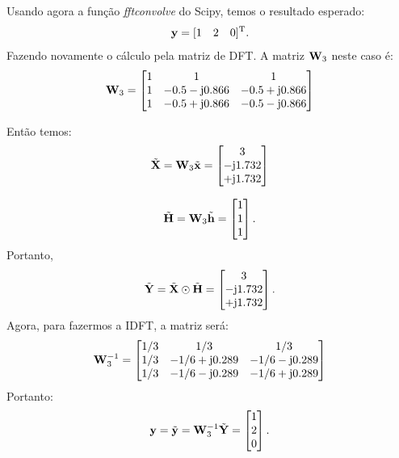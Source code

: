 \documentclass{homeworkclass}
\begin{document}
\begin{homeworkProblem}
\begin{equation*}
	\end{equation*}
	Usando agora a função \textit{fftconvolve} do Scipy, temos o resultado esperado:
	\begin{equation*}
	\mathbf{y} = [1 \quad 2 \quad 0]^{\mathrm{T}}. 
	\end{equation*}
	Fazendo novamente o cálculo pela matriz de DFT. A matriz $\mathbf{W}_{3}$ neste caso é:
	\begin{equation*} \mathbf{W}_{3} = 
	\begin{bmatrix} 
	1  & 1 & 1 \\ 
	1 & -0.5-\mathrm{j}0.866 & -0.5+\mathrm{j}0.866 \\
	1 & -0.5+\mathrm{j}0.866 & -0.5-\mathrm{j}0.866	
	\end{bmatrix}
	\end{equation*}
	
	Então temos:
	\begin{equation*}
	\tilde{\mathbf{X}} = \mathbf{W}_{3}\tilde{\mathbf{x}} = 	\begin{bmatrix} 
	3 \\ 
	-\mathrm{j}1.732 \\
	+\mathrm{j}1.732
	\end{bmatrix}
	\end{equation*}

	\begin{equation*}
	\tilde{\mathbf{H}} = \mathbf{W}_{3}\tilde{\mathbf{h}} = 	\begin{bmatrix} 
	1 \\ 
	1 \\ 
	1 
	\end{bmatrix}.
	\end{equation*}
	Portanto,
	\begin{equation*}
	\tilde{\mathbf{Y}} = \tilde{\mathbf{X}} \odot \tilde{\mathbf{H}} = \begin{bmatrix} 
	3 \\ 
	-\mathrm{j}1.732 \\
	+\mathrm{j}1.732
	\end{bmatrix}.
	\end{equation*}
	Agora, para fazermos a IDFT, a matriz será:
	\begin{equation*}  \mathbf{W}_{3}^{-1} = 
	\begin{bmatrix} 
	1/3  & 1/3 & 1/3 \\ 
	1/3 & -1/6 +\mathrm{j}0.289 & -1/6-\mathrm{j}0.289 \\
	1/3 & -1/6 -\mathrm{j}0.289 & -1/6+\mathrm{j}0.289	
	\end{bmatrix}
	\end{equation*}
	Portanto:
	\begin{equation*}
	\mathbf{y} = \tilde{\mathbf{y}} = \mathbf{W}_{3}^{-1} \tilde{\mathbf{Y}} = \begin{bmatrix} 
	1 \\ 
	2 \\
	0
	\end{bmatrix}.
	\end{equation*}	
	
	
	
\end{homeworkProblem}

\end{document}
